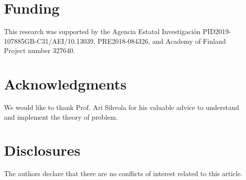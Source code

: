 \documentclass{osa-article}
\begin{document}
\section*{Funding}
This research was supported by the Agencia Estatal Investigación PID2019-107885GB-C31/AEI/10.13039,
PRE2018-084326, and Academy of Finland Project number 327640.


\section*{Acknowledgments}
We would like to thank Prof. Ari Sihvola for his valuable advice to understand and implement the theory of problem.

\section*{Disclosures}
The authors declare that there are no conflicts of interest related to this article.

%

%


\end{document}
